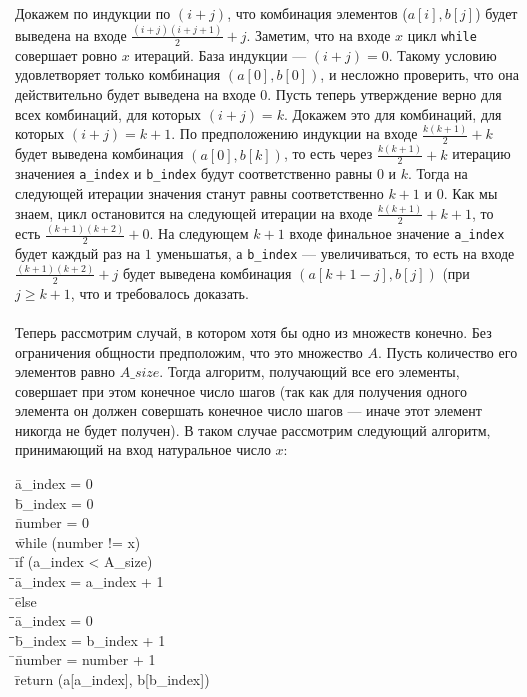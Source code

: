 \documentclass[a4paper,12pt]{article}
\newcommand{\tab}{\quad\=}
\newenvironment{programm}{
    \ttfamily
    \smallskip
    \begin{tabbing}
    }
    {
    \end{tabbing}
    \smallskip
}
\begin{document}
	
	Докажем по индукции по $(i+j)$, что комбинация элементов ($a[i], b[j]$) будет выведена на входе $\frac{(i+j)(i+j+1)}2+j$. Заметим, что на входе $x$ цикл \texttt{while} совершает ровно $x$ итераций. База индукции --- $(i+j)=0$. Такому условию удовлетворяет только комбинация $(a[0], b[0])$, и несложно проверить, что она действительно будет выведена на входе $0$. Пусть теперь утверждение верно для всех комбинаций, для которых $(i+j)=k$. Докажем это для комбинаций, для которых $(i+j)=k+1$. По предположению индукции на входе $\frac{k(k+1)}2+k$ будет выведена комбинация $(a[0], b[k])$, то есть через $\frac{k(k+1)}2+k$ итерацию значениея \texttt{a\_index} и \texttt{b\_index} будут соответственно равны $0$ и $k$. Тогда на следующей итерации значения станут равны соответственно $k+1$ и $0$. Как мы знаем, цикл остановится на следующей итерации на входе $\frac{k(k+1)}2+k+1$, то есть $\frac{(k+1)(k+2)}2+0$. На следующем $k+1$ входе финальное значение \texttt{a\_index} будет каждый раз на $1$ уменьшатья, а \texttt{b\_index} --- увеличиваться, то есть на входе $\frac{(k+1)(k+2)}2+j$ будет выведена комбинация $(a[k+1-j], b[j])$ (при $j\geqslant k+1$, что и требовалось доказать.\\\\
	Теперь рассмотрим случай, в котором хотя бы одно из множеств конечно. Без ограничения общности предположим, что это множество $A$. Пусть количество его элементов равно $A\_size$. Тогда алгоритм, получающий все его элементы, совершает при этом конечное число шагов (так как для получения одного элемента он должен совершать конечное число шагов --- иначе этот элемент никогда не будет получен). В таком случае рассмотрим следующий алгоритм, принимающий на вход натуральное число $x$:
	\begin{programm}
    \tab a\_index = 0\\
    \tab b\_index = 0\\
    \tab number = 0\\
    \tab while (number != x)\\
    \tab \tab if (a\_index < A\_size)\\
    \tab \tab \tab a\_index = a\_index + 1\\
    \tab \tab else\\
    \tab \tab \tab a\_index = 0\\
    \tab \tab \tab b\_index = b\_index + 1\\
    \tab \tab number = number + 1\\
    \tab return (a[a\_index], b[b\_index])\\
	\end{programm}
	
\end{document}
